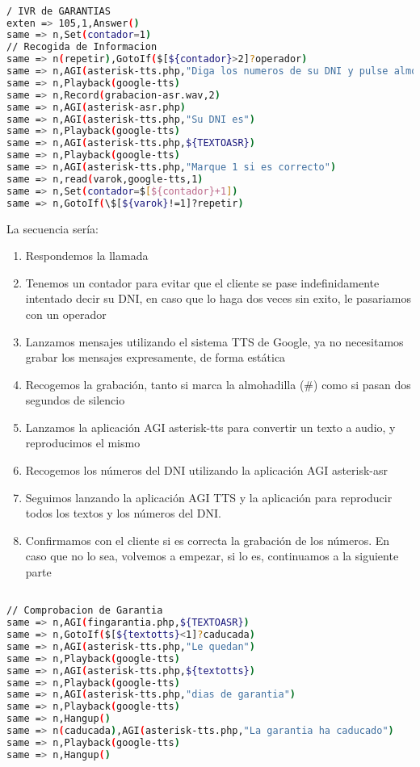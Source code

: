 \begin{lstlisting}[language=bash,title={(/etc/asterisk/extensions.conf}]

/ IVR de GARANTIAS
exten => 105,1,Answer()
same => n,Set(contador=1)
// Recogida de Informacion
same => n(repetir),GotoIf($[${contador}>2]?operador)
same => n,AGI(asterisk-tts.php,"Diga los numeros de su DNI y pulse almohadilla")
same => n,Playback(google-tts)
same => n,Record(grabacion-asr.wav,2)
same => n,AGI(asterisk-asr.php)
same => n,AGI(asterisk-tts.php,"Su DNI es")
same => n,Playback(google-tts)
same => n,AGI(asterisk-tts.php,${TEXTOASR})
same => n,Playback(google-tts)
same => n,AGI(asterisk-tts.php,"Marque 1 si es correcto")
same => n,read(varok,google-tts,1)
same => n,Set(contador=$[${contador}+1])
same => n,GotoIf(\$[${varok}!=1]?repetir)

\end{lstlisting}

La secuencia sería: 

\begin{enumerate}
	\item Respondemos la llamada
	\item Tenemos un contador para evitar que el cliente se pase indefinidamente intentado decir su DNI, en caso que lo haga dos veces sin exito, le pasariamos con un operador
	\item Lanzamos mensajes utilizando el sistema TTS de Google, ya no necesitamos grabar los mensajes expresamente, de forma estática
	\item Recogemos la grabación, tanto si marca la almohadilla (\#) como si pasan dos segundos de silencio
	\item Lanzamos la aplicación AGI asterisk-tts para convertir un texto a audio, y reproducimos el mismo
	\item Recogemos los números del DNI utilizando la aplicación AGI asterisk-asr
	\item Seguimos lanzando la aplicación AGI TTS y la aplicación para reproducir todos los textos y los números del DNI.
	\item Confirmamos con el cliente si es correcta la grabación de los números. En caso que no lo sea, volvemos a empezar, si lo es, continuamos a la siguiente parte
\end{enumerate}

\begin{lstlisting}[language=bash,title={(/etc/asterisk/extensions.conf}]

// Comprobacion de Garantia
same => n,AGI(fingarantia.php,${TEXTOASR})
same => n,GotoIf($[${textotts}<1]?caducada)
same => n,AGI(asterisk-tts.php,"Le quedan")
same => n,Playback(google-tts)
same => n,AGI(asterisk-tts.php,${textotts})
same => n,Playback(google-tts)
same => n,AGI(asterisk-tts.php,"dias de garantia")
same => n,Playback(google-tts)
same => n,Hangup()
same => n(caducada),AGI(asterisk-tts.php,"La garantia ha caducado")
same => n,Playback(google-tts)
same => n,Hangup()

\end{lstlisting}

